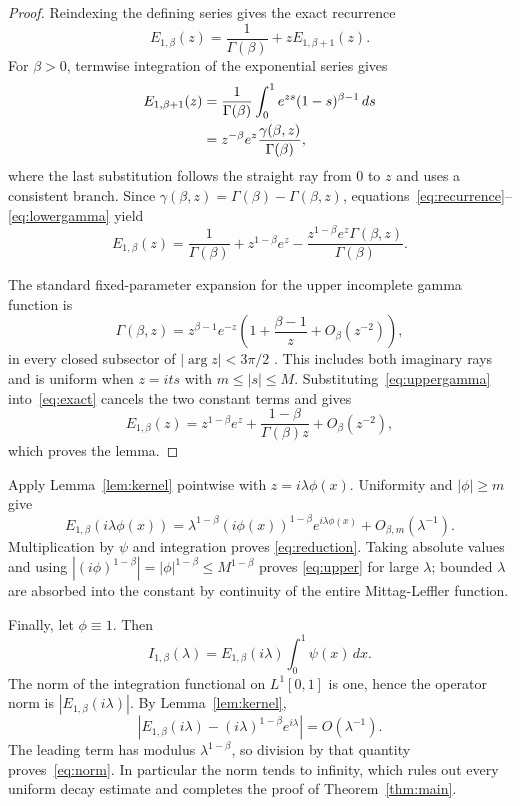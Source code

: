 \documentclass[11pt]{article}
\newcommand{\ML}[2]{E_{#1,#2}}
\begin{document}
\begin{proof}
Reindexing the defining series gives the exact recurrence
\begin{equation}\label{eq:recurrence}
 \ML{1}{\beta}(z)
 =\frac1{\Gamma(\beta)}+z\ML{1}{\beta+1}(z).
\end{equation}
For $\beta>0$, termwise integration of the exponential series gives
\begin{align}
 \ML{1}{\beta+1}(z)
 &=\frac1{\Gamma(\beta)}\int_0^1
       e^{zs}(1-s)^{\beta-1}\,ds \notag\\
 &=z^{-\beta}e^z\frac{\gamma(\beta,z)}{\Gamma(\beta)},
 \label{eq:lowergamma}
\end{align}
where the last substitution follows the straight ray from $0$ to $z$ and
uses a consistent branch. Since
$\gamma(\beta,z)=\Gamma(\beta)-\Gamma(\beta,z)$,
equations~\eqref{eq:recurrence}--\eqref{eq:lowergamma} yield
\begin{equation}\label{eq:exact}
 \ML{1}{\beta}(z)
 =\frac1{\Gamma(\beta)}+z^{1-\beta}e^z
 -\frac{z^{1-\beta}e^z\Gamma(\beta,z)}{\Gamma(\beta)}.
\end{equation}

The standard fixed-parameter expansion for the upper incomplete gamma
function is
\begin{equation}\label{eq:uppergamma}
 \Gamma(\beta,z)
 =z^{\beta-1}e^{-z}
 \left(1+\frac{\beta-1}{z}+O_\beta(z^{-2})\right),
\end{equation}
in every closed subsector of $|\arg z|<3\pi/2$
\cite[Sec.~8.11(i), Eqs.~8.11.2--8.11.3]{DLMF}. This includes both imaginary
rays and is uniform when $z=its$ with $m\leq|s|\leq M$.
Substituting~\eqref{eq:uppergamma} into~\eqref{eq:exact} cancels the two
constant terms and gives
\[
 \ML{1}{\beta}(z)
 =z^{1-\beta}e^z
 +\frac{1-\beta}{\Gamma(\beta)z}+O_\beta(z^{-2}),
\]
which proves the lemma.
\end{proof}

Apply Lemma~\ref{lem:kernel} pointwise with
$z=i\lambda\phi(x)$. Uniformity and $|\phi|\geq m$ give
\[
 \ML{1}{\beta}(i\lambda\phi(x))
 =\lambda^{1-\beta}(i\phi(x))^{1-\beta}
  e^{i\lambda\phi(x)}+O_{\beta,m}(\lambda^{-1}).
\]
Multiplication by $\psi$ and integration proves
\eqref{eq:reduction}. Taking absolute values and using
$|(i\phi)^{1-\beta}|=|\phi|^{1-\beta}\leq M^{1-\beta}$ proves
\eqref{eq:upper} for large $\lambda$; bounded $\lambda$ are absorbed into the
constant by continuity of the entire Mittag-Leffler function.

Finally, let $\phi\equiv1$. Then
\[
 I_{1,\beta}(\lambda)
 =\ML{1}{\beta}(i\lambda)\int_0^1\psi(x)\,dx.
\]
The norm of the integration functional on $L^1[0,1]$ is one, hence the
operator norm is $|\ML{1}{\beta}(i\lambda)|$. By
Lemma~\ref{lem:kernel},
\[
 \left|\ML{1}{\beta}(i\lambda)
 -(i\lambda)^{1-\beta}e^{i\lambda}\right|=O(\lambda^{-1}).
\]
The leading term has modulus $\lambda^{1-\beta}$, so division by that
quantity proves~\eqref{eq:norm}. In particular the norm tends to infinity,
which rules out every uniform decay estimate and completes the proof of
Theorem~\ref{thm:main}.
\end{document}
